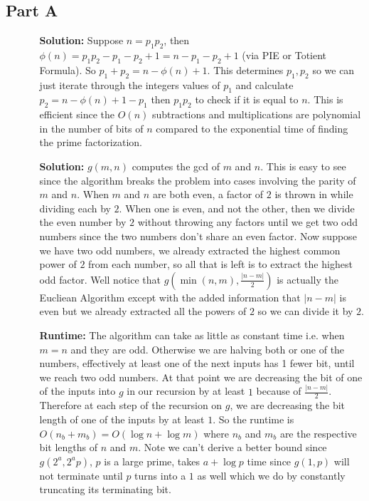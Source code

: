 \documentclass[12pt,twoside]{article}
\begin{document}
\begin{problems}
\section*{Part A}
\problem
\begin{itemize}
\item[]
\begin{itemize}
\item [\textbf{Solution:} ] Suppose $n=p_1 p_2$, then $\phi(n)=p_1 p_2 - p_1 - p_2 + 1=n-p_1-p_2+1$ (via PIE or Totient Formula). So $p_1+p_2 = n-\phi(n)+1$. This determines $p_1, p_2$ so we can just iterate through the integers values of $p_1$ and calculate $p_2=n-\phi(n)+1-p_1$ then $p_1p_2$ to check if it is equal to $n$. This is efficient since the $O(n)$ subtractions and multiplications are polynomial in the number of bits of $n$ compared to the exponential time of finding the prime factorization.
\end{itemize}
\end{itemize}
\problem
\begin{itemize}
\item[]
\begin{itemize}
\item [\textbf{Solution:} ] $g(m, n)$ computes the gcd of $m$ and $n$. This is easy to see since the algorithm breaks the problem into cases involving the parity of $m$ and $n$. When $m$ and $n$ are both even, a factor of $2$ is thrown in while dividing each by $2$. When one is even, and not the other, then we divide the even number by $2$ without throwing any factors until we get two odd numbers since the two numbers don't share an even factor. Now suppose we have two odd numbers, we already extracted the highest common power of $2$ from each number, so all that is left is to extract the highest odd factor. Well notice that $g(\min(n,m), \frac{|n-m|}{2})$ is actually the Eucliean Algorithm except with the added information that $|n-m|$ is even but we already extracted all the powers of $2$ so we can divide it by $2$.	
\item [\textbf{Runtime:} ] The algorithm can take as little as constant time i.e. when $m=n$ and they are odd. Otherwise we are halving both or one of the numbers, effectively at least one of the next inputs has 1 fewer bit, until we reach two odd numbers. At that point we are decreasing the bit of one of the inputs into $g$ in our recursion by at least $1$ because of $\frac{|n-m|}{2}$. Therefore at each step of the recursion on $g$, we are decreasing the bit length of one of the inputs by at least $1$. So the runtime is $\boxed{O(n_b+m_b)=O(\log n+\log m)}$ where $n_b$ and $m_b$ are the respective bit lengths of $n$ and $m$. Note we can't derive a better bound since $g(2^a, 2^a p)$, $p$ is a large prime, takes $a+\log p$ time since $g(1,p)$ will not terminate until $p$ turns into a $1$ as well which we do by constantly truncating its terminating bit.

\end{itemize}
\end{itemize}
\end{problems}
\end{document}
